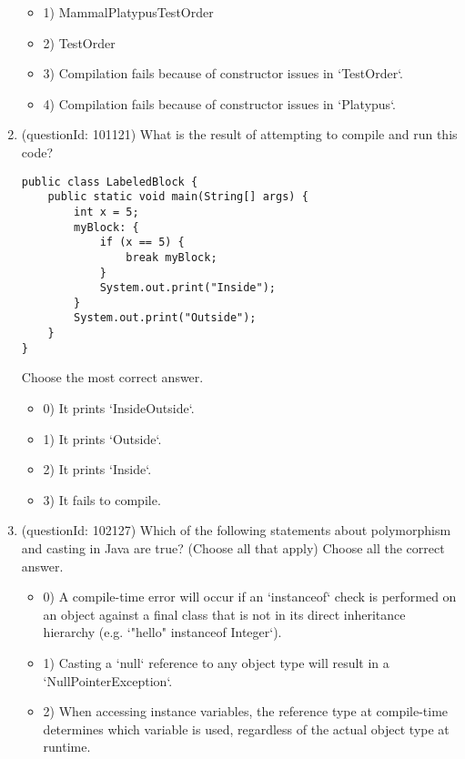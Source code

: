 \documentclass[12pt]{article}
\begin{document}
\begin{enumerate}[label=(\arabic*)]
\begin{itemize}
\item 1) MammalPlatypusTestOrder

\item 2) TestOrder

\item 3) Compilation fails because of constructor issues in `TestOrder`.

\item 4) Compilation fails because of constructor issues in `Platypus`.

\end{itemize}
\item (questionId: 101121) What is the result of attempting to compile and run this code?\n\begin{verbatim}
public class LabeledBlock {
    public static void main(String[] args) {
        int x = 5;
        myBlock: {
            if (x == 5) {
                break myBlock;
            }
            System.out.print("Inside");
        }
        System.out.print("Outside");
    }
}
\end{verbatim}
Choose the most correct answer. 
\begin{itemize}
\item 0) It prints `InsideOutside`.

\item 1) It prints `Outside`.

\item 2) It prints `Inside`.

\item 3) It fails to compile.

\end{itemize}
\item (questionId: 102127) Which of the following statements about polymorphism and casting in Java are true? (Choose all that apply)
Choose all the correct answer.\begin{itemize}
\item 0) A compile-time error will occur if an `instanceof` check is performed on an object against a final class that is not in its direct inheritance hierarchy (e.g. `"hello" instanceof Integer`).

\item 1) Casting a `null` reference to any object type will result in a `NullPointerException`.

\item 2) When accessing instance variables, the reference type at compile-time determines which variable is used, regardless of the actual object type at runtime.


\end{itemize}
\end{enumerate}
\end{document}
